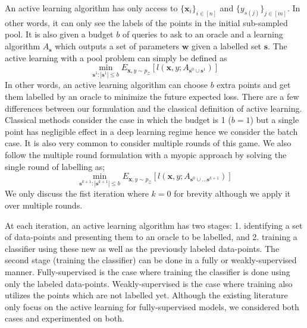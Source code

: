 \documentclass{article}
\begin{document}
An active learning algorithm has only access to $\{\mathbf{x}_i\}_{i \in [n]}$ and $\{y_{s(j)}\}_{j \in [m] }$. In other words, it can only see the labels of the points in the initial sub-sampled pool. It is also given a budget $b$ of queries to ask to an oracle and a learning algorithm $A_{\mathbf{s}}$ which outputs a set of parameters $\mathbf{w}$ given a labelled set $\mathbf{s}$. The active learning with a pool problem can simply be defined as
\begin{equation}
\min_{\mathbf{s}^1 : |\mathbf{s}^1| \leq b} E_{\mathbf{x},y \sim p_\mathcal{Z}} [l(\mathbf{x},y; A_{\mathbf{s}^0 \cup \mathbf{s}^1})]
\end{equation}
In other words, an active learning algorithm can choose $b$ extra points and get them labelled by an oracle to minimize the future expected loss. There are a few differences between our formulation and the classical definition of active learning. Classical methods consider the case in which the budget is 1 ($b=1$) but a single point has negligible effect in a deep learning regime hence we consider the batch case. It is also very common to consider multiple rounds of this game. %
We also follow the multiple round formulation with a myopic approach by solving the single round of labelling as;
\begin{equation}
\min_{\mathbf{s}^{k+1} : |\mathbf{s}^{k+1}| \leq b} E_{\mathbf{x},y \sim p_\mathcal{Z}} [l(\mathbf{x},y;A_{\mathbf{s}^{0} \cup \ldots  \mathbf{s}^{k+1}})]
\end{equation}
We only discuss the fist iteration where $k=0$ for brevity although we apply it over multiple rounds. 

At each iteration, an active learning algorithm has two stages: 1. identifying a set of data-points and presenting them to an oracle to be labelled, and 2. training a classifier using these new as well as the previously labeled data-points. The second stage (training the classifier) can be done in a fully or weakly-supervised manner. Fully-supervised is the case where training the classifier is done using only the labeled data-points. Weakly-supervised is the case where training also utilizes the points which are not labelled yet. Although the existing literature only focus on the active learning for fully-supervised models, we considered both cases and experimented on both. 
\end{document}
